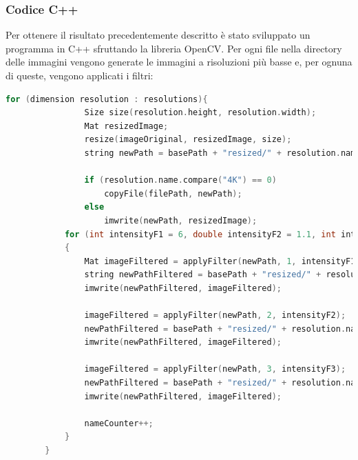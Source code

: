 \documentclass[a4paper,11pt]{article}
\begin{document}
    \subsubsection{Codice C++}
    Per ottenere il risultato precedentemente descritto è stato sviluppato un programma in C++ sfruttando la libreria OpenCV.
    Per ogni file nella directory delle immagini vengono generate le immagini a risoluzioni più basse e, per ognuna di queste, vengono applicati i filtri:
    \begin{lstlisting}[language=C++]
        for (dimension resolution : resolutions){
				Size size(resolution.height, resolution.width);
				Mat resizedImage;
				resize(imageOriginal, resizedImage, size);
				string newPath = basePath + "resized/" + resolution.name + "/" + fileName + ".tif";

				if (resolution.name.compare("4K") == 0) 
					copyFile(filePath, newPath);
				else
					imwrite(newPath, resizedImage);
            for (int intensityF1 = 6, double intensityF2 = 1.1, int intensityF3 = 5; intensityF1 <= 56, intensityF2 <= 1.5; intensityF3 <= 15; intensityF1 += 25, intensityF2 += 0.2, intensityF3 += 5) 
            {    
                Mat imageFiltered = applyFilter(newPath, 1, intensityF1);
                string newPathFiltered = basePath + "resized/" + resolution.name + "/filters/" + explode(fileName, '_')[0] + "_B" + to_string(nameCounter) + ".tif";
                imwrite(newPathFiltered, imageFiltered);
                
                imageFiltered = applyFilter(newPath, 2, intensityF2);
                newPathFiltered = basePath + "resized/" + resolution.name + "/filters/" + explode(fileName, '_')[0] + "_B" + to_string(nameCounter+3) + ".tif";
                imwrite(newPathFiltered, imageFiltered);

                imageFiltered = applyFilter(newPath, 3, intensityF3);
                newPathFiltered = basePath + "resized/" + resolution.name + "/filters/" + explode(fileName, '_')[0] + "_B" + to_string(nameCounter+3) + ".tif";
                imwrite(newPathFiltered, imageFiltered);

                nameCounter++;
            }
        }
    \end{lstlisting}

    \newpage
\end{document}
